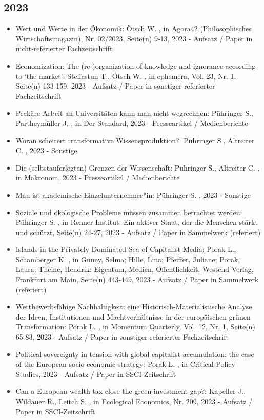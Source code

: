  \subsection{2023} 
 \begin{itemize} 
	 \item Wert und Werte in der Ökonomik: Ötsch W. , in Agora42 (Philosophisches Wirtschaftsmagazin), Nr. 02/2023, Seite(n) 9-13, 2023 - Aufsatz / Paper in nicht-referierter Fachzeitschrift
	 \item Economization: The (re-)organization of knowledge and ignorance according to ‘the market’: Steffestun T., Ötsch W. , in ephemera, Vol. 23, Nr. 1, Seite(n) 133-159, 2023 - Aufsatz / Paper in sonstiger referierter Fachzeitschrift
	 \item Prekäre Arbeit an Universitäten kann man nicht wegrechnen: Pühringer S., Partheymüller J. , in Der Standard, 2023 - Presseartikel / Medienberichte
	 \item Woran scheitert transformative Wissensproduktion?: Pühringer S., Altreiter C. , 2023 - Sonstige
	 \item Die (selbstauferlegten) Grenzen der Wissenschaft: Pühringer S., Altreiter C. , in Makronom, 2023 - Presseartikel / Medienberichte
	 \item Man ist akademische Einzelunternehmer*in: Pühringer S. , 2023 - Sonstige
	 \item Soziale und ökologische Probleme müssen zusammen betrachtet werden: Pühringer S. , in Renner Institut: Ein aktiver Staat, der die Menschen stärkt und schützt, Seite(n) 24-27, 2023 - Aufsatz / Paper in Sammelwerk (referiert)
	 \item Islands in the Privately Dominated Sea of Capitalist Media: Porak L., Schamberger K. , in Güney, Selma; Hille, Lina; Pfeiffer, Juliane; Porak, Laura; Theine, Hendrik: Eigentum, Medien, Öffentlichkeit, Westend Verlag, Frankfurt am Main, Seite(n) 443-449, 2023 - Aufsatz / Paper in Sammelwerk (referiert)
	 \item Wettbewerbsfähige Nachhaltigkeit: eine Historisch-Materialistische Analyse der Ideen, Institutionen und Machtverhältnisse in der europäischen grünen Transformation: Porak L. , in Momentum Quarterly, Vol. 12, Nr. 1, Seite(n) 65-83, 2023 - Aufsatz / Paper in sonstiger referierter Fachzeitschrift
	 \item Political sovereignty in tension with global capitalist accumulation: the case of the European socio-economic strategy: Porak L. , in Critical Policy Studies, 2023 - Aufsatz / Paper in SSCI-Zeitschrift
	 \item Can a European wealth tax close the green investment gap?: Kapeller J., Wildauer R., Leitch S. , in Ecological Economics, Nr. 209, 2023 - Aufsatz / Paper in SSCI-Zeitschrift

\end{itemize}
